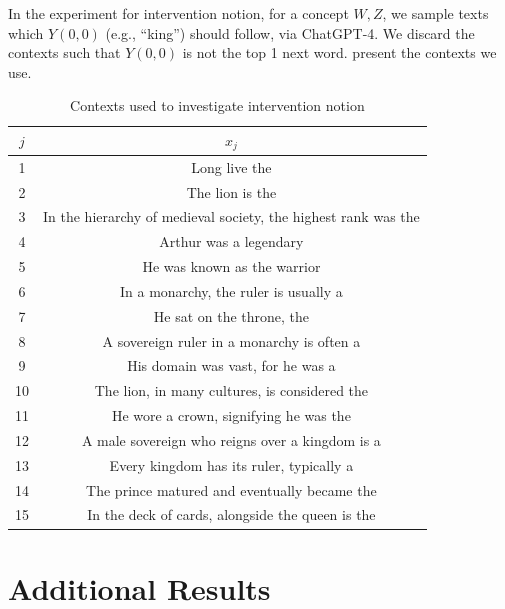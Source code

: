 \documentclass{article}
\theoremstyle{plain}
\theoremstyle{definition}
\theoremstyle{remark}
\begin{document}
In the experiment for intervention notion, for a concept $W, Z$, we sample texts which $Y(0,0)$ (e.g., ``king'') should follow, via ChatGPT-4. We discard the contexts such that $Y(0,0)$ is not the top 1 next word.  present the contexts we use.
\begin{table}[t]
\caption{Contexts used to investigate intervention notion}
\label{tbl:intervention_texts}
\vskip 0.15in
\begin{center}
\begin{small}
\begin{tabular}{cc}
        \toprule
        $j$ & $x_j$\\
        \midrule
        1 & Long live the\\
        2 & The lion is the\\
        3 & In the hierarchy of medieval society, the highest rank was the\\
        4 & Arthur was a legendary\\
        5 & He was known as the warrior\\
        6 & In a monarchy, the ruler is usually a\\
        7 & He sat on the throne, the\\
        8 & A sovereign ruler in a monarchy is often a\\
        9 & His domain was vast, for he was a\\
        10 & The lion, in many cultures, is considered the\\
        11 & He wore a crown, signifying he was the\\
        12 & A male sovereign who reigns over a kingdom is a\\
        13 & Every kingdom has its ruler, typically a\\
        14 & The prince matured and eventually became the\\
        15 & In the deck of cards, alongside the queen is the\\
        \bottomrule
\end{tabular}
\end{small}
\end{center}
\vskip -0.1in
\end{table}



\section{Additional Results}\label{sec:additional_results}
\end{document}
